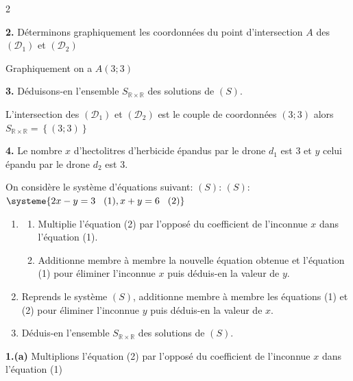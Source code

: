 \begin{multicols*}{2}
  	
  	\textbf{2.} Déterminons graphiquement les coordonnées du point d'intersection $A$ des $(\mathcal{D}_{1})$ et $(\mathcal{D}_{2})$
  	
  	Graphiquement on a $A(3;3)$
  	
  	\textbf{3.}  Déduisons-en l'ensemble $S_{\mathbb{R}\times \mathbb{R}}$  des solutions de $(S)$.
  	
  	L'intersection  des $(\mathcal{D}_{1})$ et $(\mathcal{D}_{2})$ est le couple de coordonnées $\left(3;3\right)$ alors
  	$S_{\mathbb{R}\times \mathbb{R}}= \left\{\left(3;3\right)\right\}$
  	
  	\textbf{4.} Le nombre $x$ d'hectolitres d'herbicide épandus par le drone $d_{1}$ est 3 et $y$ celui épandu par le drone $d_{2}$ est 3.
  	
  	
  	
  	
  	On considère le système d’équations suivant: $(S)$: $(S)$: $\systeme{2x-y=3 \hspace{0.3cm} (1), x+y=6 \hspace{0.3cm} (2)}$
  	\begin{enumerate}
  		\item 
  		\begin{enumerate}
  			\item Multiplie l'équation (2) par l'opposé du coefficient de l'inconnue $x$ dans l'équation (1).
  			\item  Additionne membre à membre la nouvelle équation obtenue et l'équation (1) pour éliminer l'inconnue $x$ puis déduis-en la valeur de $y$. 
  		\end{enumerate}
  		\item Reprends le système $(S)$, additionne membre à membre les équations (1) et (2)   pour éliminer l'inconnue $y$ puis déduis-en la valeur de $x$. 
  		\item  Déduis-en l'ensemble $S_{\mathbb{R}\times \mathbb{R}}$  des solutions de $(S)$.
  	\end{enumerate}
  	\dure
  	\resul
  	\textbf{1.(a)} Multiplions l'équation (2) par l'opposé du coefficient de l'inconnue $x$ dans l'équation (1)
  	

\end{multicols*}
